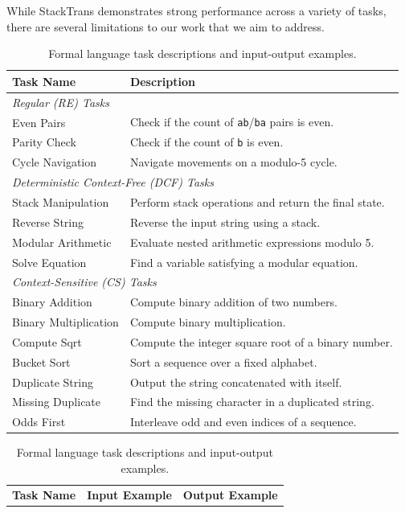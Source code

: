 \documentclass{article}
\DeclareRobustCommand{\method}{{\sc StackTrans}\xspace}
\begin{document}
While \method demonstrates strong performance across a variety of tasks, there are several limitations to our work that we aim to address.


\begin{table}[t]
\centering
\caption{Formal language task descriptions and input-output examples.}
\label{tab:formal_tasks}
\begin{tabular}{ll}
\toprule
\textbf{Task Name} & \textbf{Description} \\
\midrule
\multicolumn{2}{l}{\textit{Regular (RE) Tasks}} \\
Even Pairs         & Check if the count of \texttt{ab}/\texttt{ba} pairs is even. \\
Parity Check       & Check if the count of \texttt{b} is even. \\
Cycle Navigation   & Navigate movements on a modulo-5 cycle. \\
\midrule
\multicolumn{2}{l}{\textit{Deterministic Context-Free (DCF) Tasks}} \\
Stack Manipulation & Perform stack operations and return the final state. \\
Reverse String     & Reverse the input string using a stack. \\
Modular Arithmetic & Evaluate nested arithmetic expressions modulo 5. \\
Solve Equation     & Find a variable satisfying a modular equation. \\
\midrule
\multicolumn{2}{l}{\textit{Context-Sensitive (CS) Tasks}} \\
Binary Addition    & Compute binary addition of two numbers. \\
Binary Multiplication & Compute binary multiplication. \\
Compute Sqrt       & Compute the integer square root of a binary number. \\
Bucket Sort        & Sort a sequence over a fixed alphabet. \\
Duplicate String   & Output the string concatenated with itself. \\
Missing Duplicate  & Find the missing character in a duplicated string. \\
Odds First         & Interleave odd and even indices of a sequence. \\
\bottomrule
\end{tabular}
\begin{tabular}{lll}
\toprule
\textbf{Task Name} & \textbf{Input Example} & \textbf{Output Example} \\

\end{tabular}
\end{table}
\end{document}
